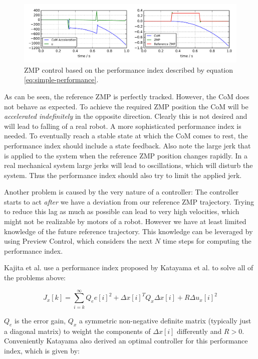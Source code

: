 \documentclass[english,ngerman]{KITreprt}
\begin{document}
\begin{figure}[tb]
\vspace*{-1em}
\includegraphics[width=\textwidth]{images/simple_zmp_control.png}
\caption{ZMP control based on the performance index described by equation \ref{eq:simple-performance}.}
\label{img:simple-zmp-control}
\end{figure}

As can be seen, the reference ZMP is perfectly tracked. However, the CoM
does not behave as expected. To achieve the required ZMP position the
CoM will be \emph{accelerated indefinitely} in the opposite direction.
Clearly this is not desired and will lead to falling of a real robot. A
more sophisticated performance index is needed. To eventually reach a
stable state at which the CoM comes to rest, the performance index
should include a state feedback. Also note the large jerk that is
applied to the system when the reference ZMP position changes rapidly.
In a real mechanical system large jerks will lead to oscillations, which
will disturb the system. Thus the performance index should also try to
limit the applied jerk.

Another problem is caused by the very nature of a controller: The
controller starts to act \emph{after} we have a deviation from our
reference ZMP trajectory. Trying to reduce this lag as much as possible
can lead to very high velocities, which might not be realizable by
motors of a robot. However we have at least limited knowledge of the
future reference trajectory. This knowledge can be leveraged by using
Preview Control, which considers the next $N$ time steps for computing
the performance index.

Kajita et al. use a performance index proposed by Katayama et al.
\cite{katayama1985design} to solve all of the problems above:

\begin{equation}
J_x[k] = \sum^{\infty}_{i=k} Q_e e[i]^2 + \Delta x[i]^T Q_x \Delta x[i] + R \Delta u_x[i]^2
\end{equation}

$Q_e$ is the error gain, $Q_x$ a symmetric non-negative definite matrix
(typically just a diagonal matrix) to weight the components of
$\Delta x[i]$ differently and $R > 0$. Conveniently Katayama also
derived an optimal controller for this performance index, which is given
by:
\end{document}
